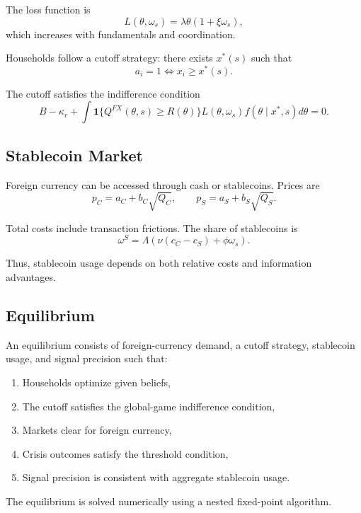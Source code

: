 The loss function is
\begin{equation}
 L(\theta,\omega_s) = \lambda \theta (1 + \xi \omega_s),
\end{equation}
which increases with fundamentals and coordination.

Households follow a cutoff strategy: there exists $x^*(s)$ such that
\begin{equation}
 a_i = 1 \iff x_i \ge x^*(s).
\end{equation}

The cutoff satisfies the indifference condition
\begin{equation}
 B - \kappa_r + \int \mathbf{1}\{Q^{FX}(\theta,s) \ge R(\theta)\} L(\theta,\omega_s) f(\theta \mid x^*, s) d\theta = 0.
\end{equation}

\subsection{Stablecoin Market}

Foreign currency can be accessed through cash or stablecoins. Prices are
\begin{equation}
 p_C = a_C + b_C \sqrt{Q_C}, \qquad p_S = a_S + b_S \sqrt{Q_S}.
\end{equation}

Total costs include transaction frictions. The share of stablecoins is
\begin{equation}
 \omega^S = \Lambda(\nu(c_C - c_S) + \phi \omega_s).
\end{equation}

Thus, stablecoin usage depends on both relative costs and information advantages.

\subsection{Equilibrium}

An equilibrium consists of foreign-currency demand, a cutoff strategy, stablecoin usage, and signal precision such that:
\begin{enumerate}
\item Households optimize given beliefs,
\item The cutoff satisfies the global-game indifference condition,
\item Markets clear for foreign currency,
\item Crisis outcomes satisfy the threshold condition,
\item Signal precision is consistent with aggregate stablecoin usage.
\end{enumerate}

The equilibrium is solved numerically using a nested fixed-point algorithm.
